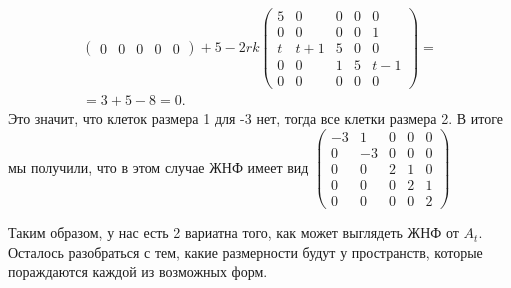 \begin{itemize}
\begin{gather*}
\begin{pmatrix}
            0 & 0 & 0 & 0 & 0
        \end{pmatrix} + 5 - 2rk \begin{pmatrix}
            5 & 0 & 0 & 0 & 0\\
            0 & 0 & 0 & 0 & 1\\
            t & t+1 & 5 & 0 & 0\\
            0 & 0 & 1 & 5 & t-1\\
            0 & 0 & 0 & 0 & 0
        \end{pmatrix} = \\ = 3 + 5 - 8 = 0.
    \end{gather*}
    Это значит, что клеток размера 1 для -3 нет, тогда все клетки размера 2. В итоге мы получили, что в этом случае ЖНФ имеет вид $\begin{pmatrix}
        -3 & 1 & 0 & 0 & 0\\
        0 & -3 & 0 & 0 & 0\\
        0 & 0 & 2 & 1 & 0\\
        0 & 0 & 0 & 2 & 1\\
        0 & 0 & 0 & 0 & 2
    \end{pmatrix}$
\end{itemize}
Таким образом, у нас есть 2 вариатна того, как может выглядеть ЖНФ от $A_t$. Осталось разобраться с тем, какие размерности будут у пространств, которые пораждаются каждой из возможных форм.
